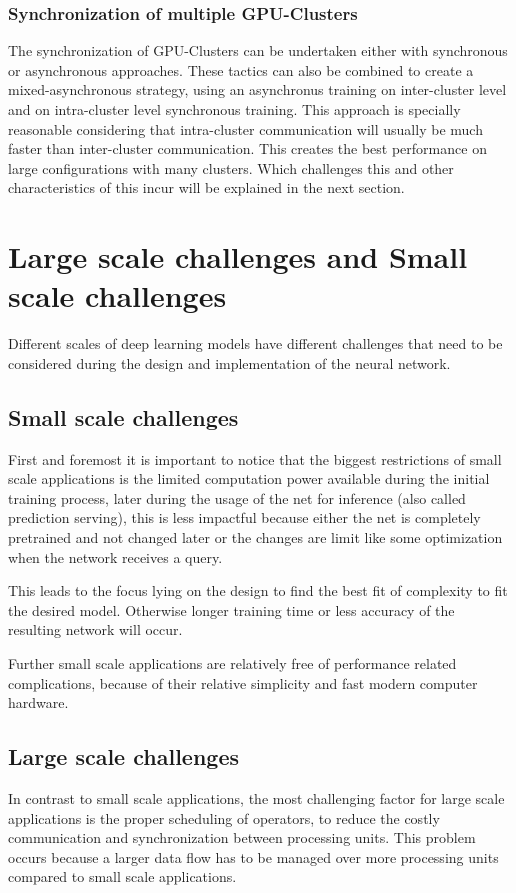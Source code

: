 \documentclass[conference]{IEEEtran}
\begin{document}
\subsubsection{Synchronization of multiple GPU-Clusters}
The synchronization of GPU-Clusters can be undertaken either with synchronous or asynchronous approaches. These tactics can also be combined to create a mixed-asynchronous strategy, using an asynchronus training on inter-cluster level and on intra-cluster level synchronous training\cite{sastre2017scalability}. This approach is specially reasonable considering that intra-cluster communication will usually be much faster than inter-cluster communication. This creates the best performance on large configurations with many clusters\cite{wang2016deep}. Which challenges this and other characteristics of this incur will be explained in the next section.



\section{Large scale challenges and Small scale challenges}
Different scales of deep learning models have different challenges that need to be considered during the design and implementation of the neural network.

\subsection{Small scale challenges}
First and foremost it is important to notice that the biggest restrictions of small scale applications is the limited computation power available during the initial training process, later during the usage of the net for inference (also called prediction serving), this is less impactful because either the net is completely pretrained and not changed later or the changes are limit like some optimization when the network receives a query.

This leads to the focus lying on the design to find the best fit of complexity to fit the desired model. Otherwise longer training time or less accuracy of the resulting network will occur.

Further small scale applications are relatively free of performance related complications, because of their relative simplicity and fast modern computer hardware.

\subsection{Large scale challenges}
In contrast to small scale applications, the most challenging factor for large scale applications is the proper scheduling of operators, to reduce the costly communication and synchronization between processing units. This problem occurs because a larger data flow has to be managed over more processing units compared to small scale applications.
\end{document}
